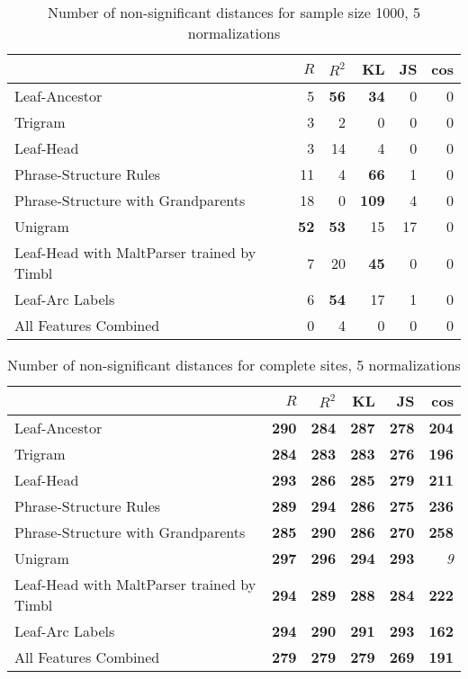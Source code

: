 \begin{table}
\begin{tabular}{l|rrrrr}
& $R$ & $R^2$ & KL & JS & cos  \\ \hline
  Leaf-Ancestor&5 & \textbf{56} & \textbf{34} & 0 & 0\\
  Trigram&3 & 2 & 0 & 0 & 0\\
  Leaf-Head&3 & 14 & 4 & 0 & 0\\
  Phrase-Structure Rules&11 & 4 & \textbf{66} & 1 & 0\\
  Phrase-Structure with Grandparents&18 & 0 & \textbf{109} & 4 & 0\\
  Unigram&\textbf{52} & \textbf{53} & 15 & 17 & 0\\
  Leaf-Head with MaltParser trained by Timbl&7 & 20 & \textbf{45} & 0 & 0\\
  Leaf-Arc Labels&6 & \textbf{54} & 17 & 1 & 0\\
  All Features Combined&0 & 4 & 0 & 0 & 0\\
\end{tabular}
\caption{Number of non-significant distances for sample size 1000, 5
  normalizations}
\label{sig-5-1000}
\end{table}
\begin{table}
\begin{tabular}{l|rrrrr}
& $R$ & $R^2$ & KL & JS & cos  \\ \hline
  Leaf-Ancestor&\textbf{290} & \textbf{284} & \textbf{287} & \textbf{278} & \textbf{204}\\
  Trigram&\textbf{284} & \textbf{283} & \textbf{283} & \textbf{276} & \textbf{196}\\
  Leaf-Head&\textbf{293} & \textbf{286} & \textbf{285} & \textbf{279} & \textbf{211}\\
  Phrase-Structure Rules&\textbf{289} & \textbf{294} & \textbf{286} & \textbf{275} & \textbf{236}\\
  Phrase-Structure with Grandparents&\textbf{285} & \textbf{290} & \textbf{286} & \textbf{270} & \textbf{258}\\
  Unigram&\textbf{297} & \textbf{296} & \textbf{294} & \textbf{293} &
  \textit{9}\\
  Leaf-Head with MaltParser trained by Timbl&\textbf{294} & \textbf{289} & \textbf{288} & \textbf{284} & \textbf{222}\\
  Leaf-Arc Labels&\textbf{294} & \textbf{290} & \textbf{291} & \textbf{293} & \textbf{162}\\
  All Features Combined&\textbf{279} & \textbf{279} & \textbf{279} & \textbf{269} & \textbf{191}\\
\end{tabular}
 \caption{Number of non-significant distances for complete sites, 5
   normalizations}
 \label{sig-5-full}
\end{table}

